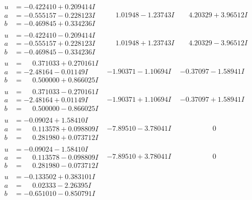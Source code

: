 \documentclass[1p]{elsarticle_modified}
\theoremstyle{definition}
\begin{document}
$$\begin{array}{c|c|c}
 \hline 
\begin{aligned}
u &= -0.422410 + 0.209414 I \\
a &= -0.555157 - 0.228123 I \\
b &= -0.469845 + 0.334236 I\end{aligned}
 & \phantom{-}1.01948 - 1.23743 I & \phantom{-}4.20329 + 3.96512 I \\ \hline\begin{aligned}
u &= -0.422410 - 0.209414 I \\
a &= -0.555157 + 0.228123 I \\
b &= -0.469845 - 0.334236 I\end{aligned}
 & \phantom{-}1.01948 + 1.23743 I & \phantom{-}4.20329 - 3.96512 I \\ \hline\begin{aligned}
u &= \phantom{-}0.371033 + 0.270161 I \\
a &= -2.48164 - 0.01149 I \\
b &= \phantom{-}0.500000 + 0.866025 I\end{aligned}
 & -1.90371 - 1.10694 I & -0.37097 - 1.58941 I \\ \hline\begin{aligned}
u &= \phantom{-}0.371033 - 0.270161 I \\
a &= -2.48164 + 0.01149 I \\
b &= \phantom{-}0.500000 - 0.866025 I\end{aligned}
 & -1.90371 + 1.10694 I & -0.37097 + 1.58941 I \\ \hline\begin{aligned}
u &= -0.09024 + 1.58410 I \\
a &= \phantom{-}0.113578 + 0.098809 I \\
b &= \phantom{-}0.281980 + 0.073712 I\end{aligned}
 & -7.89510 - 3.78041 I & \phantom{-0.000000 } 0 \\ \hline\begin{aligned}
u &= -0.09024 - 1.58410 I \\
a &= \phantom{-}0.113578 - 0.098809 I \\
b &= \phantom{-}0.281980 - 0.073712 I\end{aligned}
 & -7.89510 + 3.78041 I & \phantom{-0.000000 } 0 \\ \hline\begin{aligned}
u &= -0.133502 + 0.383101 I \\
a &= \phantom{-}0.02333 - 2.26395 I \\
b &= -0.651010 - 0.850791 I\end{aligned}

\end{array}$$
\end{document}
